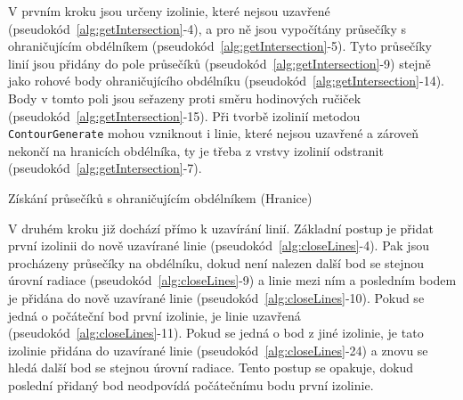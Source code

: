 V prvním kroku jsou určeny izolinie, které nejsou uzavřené
(pseudokód~\ref{alg:getIntersection}-4), a pro ně jsou vypočítány
průsečíky s ohraničujícím obdélníkem
(pseudokód~\ref{alg:getIntersection}-5). Tyto průsečíky linií jsou
přidány do pole průsečíků (pseudokód~\ref{alg:getIntersection}-9)
stejně jako rohové body ohraničujícího obdélníku
(pseudokód~\ref{alg:getIntersection}-14). Body v tomto poli jsou
seřazeny proti směru hodinových ručiček
(pseudokód~\ref{alg:getIntersection}-15). Při tvorbě izolinií metodou
\texttt{ContourGenerate} mohou vzniknout i linie, které nejsou
uzavřené a zároveň nekončí na hranicích obdélníka, ty je třeba z
vrstvy izolinií odstranit (pseudokód~\ref{alg:getIntersection}-7).

\begin{algorithm}
\caption{Získání průsečíků s ohraničujícím obdélníkem (Hranice)}
\label{alg:getIntersection}
    \begin{algorithmic}[1] 
			\ELSE
			\ENDIF	
		\ENDIF
	\ENDWHILE
    \end{algorithmic}
\end{algorithm}

V druhém kroku již dochází přímo k uzavírání linií. Základní postup je
přidat první izolinii do nově uzavírané linie
(pseudokód~\ref{alg:closeLines}-4). Pak jsou procházeny průsečíky na
obdélníku, dokud není nalezen další bod se stejnou úrovní radiace
(pseudokód~\ref{alg:closeLines}-9) a linie mezi ním a posledním bodem
je přidána do nově uzavírané linie
(pseudokód~\ref{alg:closeLines}-10). Pokud se jedná o počáteční bod
první izolinie, je linie uzavřená
(pseudokód~\ref{alg:closeLines}-11). Pokud se jedná o bod z jiné
izolinie, je tato izolinie přidána do uzavírané linie
(pseudokód~\ref{alg:closeLines}-24) a znovu se hledá další bod se
stejnou úrovní radiace. Tento postup se opakuje, dokud poslední
přidaný bod neodpovídá počátečnímu bodu první izolinie.



